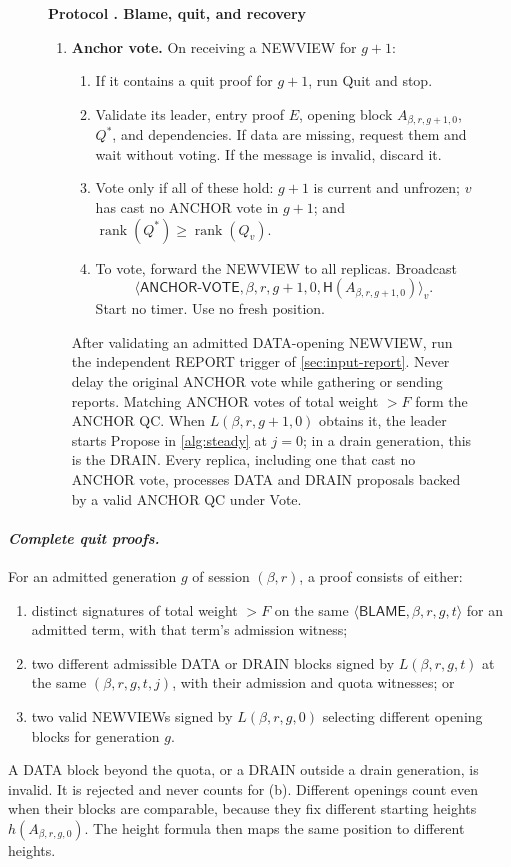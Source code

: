 \documentclass[11pt,a4paper]{article}
\newcommand{\RR}[1]{{\color{rrRed}#1}}
\newcommand{\Hash}{\mathsf H}
\newcommand{\rank}{\operatorname{rank}}
\newcommand{\tagg}[1]{\ensuremath{\mathsf{#1}}}
\newcommand{\defterm}[1]{\textcolor{rrBlue}{\textit{#1}}}
\newcounter{protocol}
\newenvironment{protocol}[3][htbp]{\begin{figure}[#1]\refstepcounter{protocol}\label{#2}
\begin{mdframed}[linewidth=.6pt,skipabove=0pt,skipbelow=0pt,
innertopmargin=7pt,innerbottommargin=7pt]\small
\textbf{Protocol \theprotocol. #3}\par\smallskip}{\end{mdframed}\end{figure}}
\begin{document}
\begin{protocol}{alg:recovery}{Blame, quit, and recovery}
\begin{enumerate}[label=\textbf{\arabic*)},itemsep=3pt]
\item \textbf{Anchor vote.} On receiving a NEWVIEW for $g+1$:
 \begin{enumerate}[label=(\alph*)]
 \item If it contains a quit proof for $g+1$, run Quit and stop.
 \item Validate its leader, entry proof $E$, opening block $A_{\beta,r,g+1,0}$,
       $Q^*$, and dependencies. If data are missing, request them and
       wait without voting. If the message is invalid, discard it.
 \item Vote only if all of these hold: $g+1$ is current and unfrozen; $v$
       has cast no ANCHOR vote in $g+1$; and $\rank(Q^*)\ge\rank(Q_v)$.
 \item To vote, forward the NEWVIEW to all replicas. Broadcast
       \[\langle\tagg{ANCHOR\mbox{-}VOTE},\beta,r,g+1,0,\Hash(A_{\beta,r,g+1,0})\rangle_v.\]
       Start no timer. Use no fresh position.
 \end{enumerate}
 After validating an admitted DATA-opening NEWVIEW, run the independent
 REPORT trigger of \cref{sec:input-report}. Never delay the original
 ANCHOR vote while gathering or sending reports.
 Matching ANCHOR votes \RR{of total weight $>F$} form the ANCHOR QC.
 When $L(\beta,r,g+1,0)$ obtains it, the leader starts Propose in
 \cref{alg:steady} at $j=0$\RR{; in a drain generation, this is the
 DRAIN}. Every replica, including one that cast no ANCHOR vote,
 processes DATA \RR{and DRAIN} proposals backed by a valid ANCHOR QC
 under Vote.
\end{enumerate}
\end{protocol}

\paragraph{\defterm{Complete quit proofs.}}
For an admitted generation $g$ \RR{of session $(\beta,r)$}, a proof consists of
either:
\begin{enumerate}[label=(\alph*)]
\item distinct signatures \RR{of total weight $>F$} on the same
$\langle\tagg{BLAME},\beta,r,g,t\rangle$ for an admitted term, with that term's
admission witness;
\item two different admissible DATA \RR{or DRAIN} blocks signed by
$L(\beta,r,g,t)$ at the same $(\beta,r,g,t,j)$, with their admission \RR{and quota}
witnesses; or
\item two valid NEWVIEWs signed by $L(\beta,r,g,0)$ selecting different opening
blocks for generation $g$.
\end{enumerate}
\RR{A DATA block beyond the quota, or a DRAIN outside a drain generation,
is invalid. It is rejected and never counts for (b).}
Different openings count even when their blocks are comparable, because
they fix different starting heights $h(A_{\beta,r,g,0})$. The height formula then
maps the same position to different heights.
\end{document}
